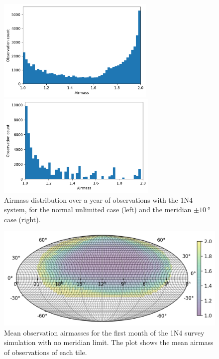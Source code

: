 \begin{colsection}
\begin{colsection}
\begin{figure}[p]
    \begin{center}
        \begin{minipage}[t]{0.49\textwidth}\vspace{10pt}
            \includegraphics[height=140pt]{images/survey_sims/365_1N4_lite_airmass3.png}
        \end{minipage}
        \begin{minipage}[t]{0.49\textwidth}\vspace{10pt}
            \includegraphics[height=140pt]{images/survey_sims/365_1N4_meridian_airmass3.png}
        \end{minipage}
    \end{center}
    \caption[Airmass distribution over a year of observations]{
        Airmass distribution over a year of observations with the 1N4 system, for the normal unlimited case (left) and the meridian $\pm\SI{10}{\degree}$ case (right).
    }\label{fig:survey_sim_airmass_365}
\end{figure}

\begin{figure}[p]
    \begin{center}
        \includegraphics[width=0.7\linewidth]{images/survey_sims/30_1N4_lite_airmass.png}
    \end{center}
    \caption[Mean observation airmasses for the 1N4 survey simulation]{
        Mean observation airmasses for the first month of the 1N4 survey simulation with no meridian limit. The plot shows the mean airmass of observations of each tile.
    }\label{fig:survey_sim_airmass_normal}
\end{figure}


\end{colsection}
\end{colsection}
